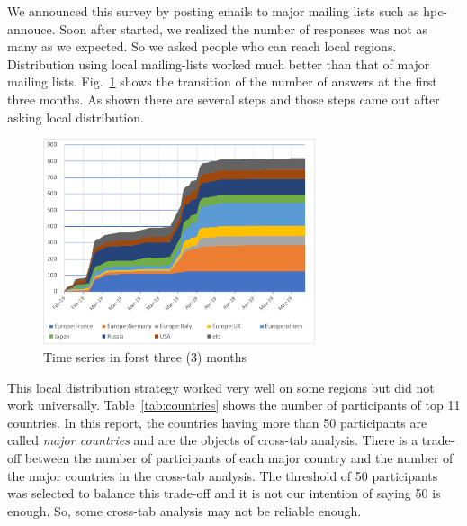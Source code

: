 \documentclass[conference,10pt,letterpaper]{IEEEtran}
\begin{document}
%
%
We announced this survey by posting emails to major mailing lists such
as hpc-annouce. Soon after started, we realized the number of
responses was not as many as we expected. So we asked people who can
reach local regions. Distribution using local mailing-lists worked
much better than that of major mailing
lists. Fig.~\ref{fig:time-series} shows the transition of the number
of answers at the first three months. As shown there are several steps
and those steps came out after asking local distribution. 
%
\begin{figure}[htb]
\begin{center}
\includegraphics[width=8cm]{Figs/TimeSeries-Zoom.pdf}
\caption{Time series in forst three (3) months}
\label{fig:time-series}
\end{center}
\end{figure}
%
This local distribution strategy worked very well on some regions but
did not work universally. Table~\ref{tab:countries} shows the number
of participants of top 11 countries. In this report, the
countries having more than 50 participants are called {\it major
  countries} and are the objects of cross-tab analysis. There is a
trade-off between the number of participants of each major country
and the number of the major countries in the cross-tab analysis. The
threshold of 50 participants was selected to balance this trade-off
and it is not our intention of saying 50 is enough. So, some cross-tab
analysis may not be reliable enough.
\end{document}
